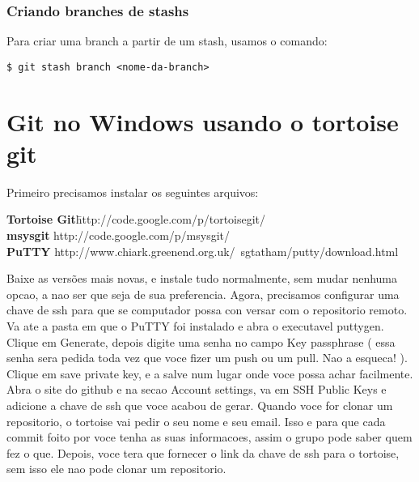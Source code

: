 \documentclass{article}
\begin{document}
\subsubsection{Criando branches de stashs}
    Para criar uma branch a partir de um stash, usamos o comando:
    \begin{tabbing}
        \hspace{1cm}\=\verb#$ git stash branch <nome-da-branch>#
    \end{tabbing}

\section{Git no Windows usando o tortoise git}
    Primeiro precisamos instalar os seguintes arquivos:
    \begin{tabbing}
        \hspace{1cm}\=\textbf{Tortoise Git}\quad    \=http://code.google.com/p/tortoisegit/\\
                    \>\textbf{msysgit}              \>http://code.google.com/p/msysgit/\\
                    \>\textbf{PuTTY}                \>http://www.chiark.greenend.org.uk/~sgtatham/putty/download.html
    \end{tabbing}
Baixe as versões mais novas, e instale tudo normalmente, sem mudar nenhuma opcao,
a nao ser que seja de sua preferencia.
Agora, precisamos configurar uma chave de ssh para que se computador possa con
versar com o repositorio remoto. Va ate a pasta em que o PuTTY foi instalado e 
abra o executavel puttygen. Clique em Generate, depois digite uma senha no campo
Key passphrase ( essa senha sera pedida toda vez que voce fizer um push ou um 
pull. Nao a esqueca! ). Clique em save private key, e a salve num lugar onde 
voce possa achar facilmente. Abra o site do github e na secao Account settings,
va em SSH Public Keys e adicione a chave de ssh que voce acabou de gerar.
Quando voce for clonar um repositorio, o tortoise vai pedir o seu nome e seu email.
Isso e para que cada commit foito por voce tenha as suas informacoes, assim
o grupo pode saber quem fez o que. Depois, voce tera que fornecer o link da chave 
de ssh para o tortoise, sem isso ele nao pode clonar um repositorio.
\end{document}
